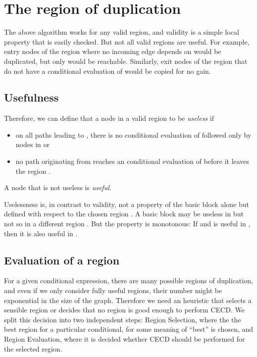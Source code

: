 \documentclass[halfparskip]{scrartcl}
\begin{document}
\section{The region of duplication}
\label{sec:region}

The above algorithm works for any valid region, and validity is a simple local property that is easily checked. But not all valid regions are useful. For example, entry nodes  of the region where no incoming edge depends on  would be duplicated, but only  would be reachable. Similarly, exit nodes of the region that do not have a conditional evaluation of  would be copied for no gain.

\subsection{Usefulness}

Therefore, we can define that a node  in a valid region  to be \textit{useless} if
\begin{itemize}
\item on all paths leading to , there is no conditional evaluation of  followed only by nodes in  or
\item no path originating from  reaches an conditional evaluation of  before it leaves the region .
\end{itemize}

A node  that is not useless is \textit{useful}.

Uselessness is, in contrast to validity, not a property of the basic block alone but defined with respect to the chosen region . A basic block may be useless in  but not so in a different region . But the property is monotonous: If  and  is useful in , then it is also useful in .

\subsection{Evaluation of a region}
\label{sec:heurisitc}

For a given conditional expression, there are many possible regions of duplication, and even if we only consider fully useful regions, their number might be exponential in the size of the graph. Therefore we need an heuristic that selects a sensible region or decides that no region is good enough to perform CECD. We split this decision into two independent steps: Region Selection, where the the best region for a particular conditional, for some meaning of “best” is chosen, and Region Evaluation, where it is decided whether CECD should be performed for the selected region.
\end{document}

